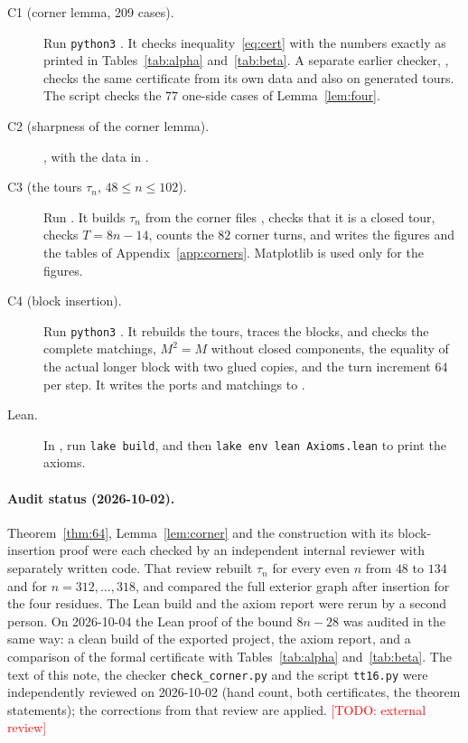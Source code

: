 \documentclass[11pt]{article}
\theoremstyle{definition}
\theoremstyle{remark}
\newcommand{\todo}[1]{\textcolor{red}{[TODO: #1]}}
\begin{document}
\begin{description}
\item[C1 (corner lemma, 209 cases).] Run \texttt{python3} . It checks inequality~\eqref{eq:cert} with the numbers exactly as printed in Tables~\ref{tab:alpha} and~\ref{tab:beta}. A separate earlier checker, , checks the same certificate from its own data and also on generated tours. The script  checks the $77$ one-side cases of Lemma~\ref{lem:four}.
\item[C2 (sharpness of the corner lemma).] , with the data in .
\item[C3 (the tours $\tau_n$, $48\le n\le102$).] Run  . It builds $\tau_n$ from the corner files , checks that it is a closed tour, checks $T=8n-14$, counts the $82$ corner turns, and writes the figures and the tables of Appendix~\ref{app:corners}. Matplotlib is used only for the figures.
\item[C4 (block insertion).] Run \texttt{python3} . It rebuilds the tours, traces the blocks, and checks the complete matchings, $M^2=M$ without closed components, the equality of the actual longer block with two glued copies, and the turn increment $64$ per step. It writes the ports and matchings to .
\item[Lean.] In , run \texttt{lake build}, and then \texttt{lake env lean Axioms.lean} to print the axioms.
\end{description}

\paragraph{Audit status (2026-10-02).}
Theorem~\ref{thm:64}, Lemma~\ref{lem:corner} and the construction with its block-insertion proof were each checked by an independent internal reviewer with separately written code.
That review rebuilt $\tau_n$ for every even $n$ from $48$ to $134$ and for $n=312,\dots,318$, and compared the full exterior graph after insertion for the four residues.
The Lean build and the axiom report were rerun by a second person.
On 2026-10-04 the Lean proof of the bound $8n-28$ was audited in the same way: a clean build of the exported project, the axiom report, and a comparison of the formal certificate with Tables~\ref{tab:alpha} and~\ref{tab:beta}.
The text of this note, the checker \texttt{check\_corner.py} and the script \texttt{tt16.py} were independently reviewed on 2026-10-02 (hand count, both certificates, the theorem statements); the corrections from that review are applied.
\todo{external review}
\end{document}
